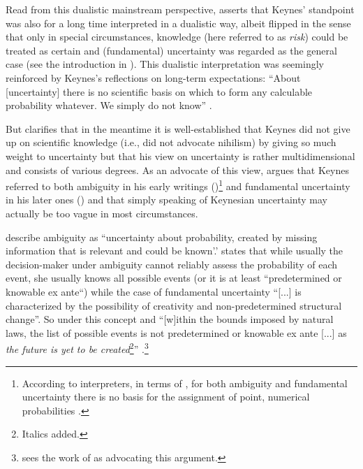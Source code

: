 \documentclass[a4paper,11pt,listof=nochaptergap,oneside,pointednumbers,bibtotoc,bigheadings,liststotoc,hidelinks]{scrbook}
\theoremstyle{mysatz}
\theoremstyle{mydefinition}
\theoremstyle{mytheorem}
\theoremstyle{mybemerkung}
\begin{document}
Read from this dualistic mainstream perspective, \citet{dow:16} asserts that Keynes' standpoint was also for a long time interpreted in a dualistic way, albeit flipped in the sense that only in special circumstances, knowledge (here referred to as \textit{risk}) could be treated as certain and (fundamental) uncertainty was regarded as the general case (see the introduction in \citealp{keynes:21}). This dualistic interpretation was seemingly reinforced by Keynes's reflections on long-term expectations: ``About [uncertainty] there is no scientific basis on which to form any calculable probability whatever. We simply do not know'' \citep[p. 214/214]{keynes:37}.

But \citet{dow:16} clarifies that in the meantime it is well-established that Keynes did not give up on scientific knowledge (i.e., did not advocate nihilism) by giving so much weight to uncertainty but that his view on uncertainty is rather multidimensional and consists of various degrees. As an advocate of this view, \citet{dequesh:00} argues that Keynes referred to both ambiguity in his early writings (\citealp{keynes:21})\footnote{According to interpreters, in terms of \citet{keynes:21}, for both ambiguity and fundamental uncertainty there is no basis for the assignment of point, numerical probabilities \citep{dequesh:00}.} and fundamental uncertainty in his later ones (\citealp{keynes:37}) and that simply speaking of Keynesian uncertainty may actually be too vague in most circumstances.

\citet[p. 330]{camererandweber:92} describe ambiguity as ``uncertainty about probability, created by missing information that is relevant and could be known'.' \citet[p. 623]{dequech:14} states that while usually the decision-maker under ambiguity cannot reliably assess the probability of each event, she usually knows all possible events (or it is at least ``predetermined or knowable ex ante``) while the case of fundamental uncertainty ``[...] is characterized by the possibility of creativity and non-predetermined structural change''. So under this concept and ``[w]ithin the bounds imposed by natural laws, the list of possible events is not predetermined or knowable ex ante [...] as \textit{the future is yet to be created}\footnote{Italics added.}'' \citep[p. 623]{dequech:14}.\footnote{\citet{dequesh:00} sees the work of \citet{shackle:72} as advocating this argument.}
\end{document}
